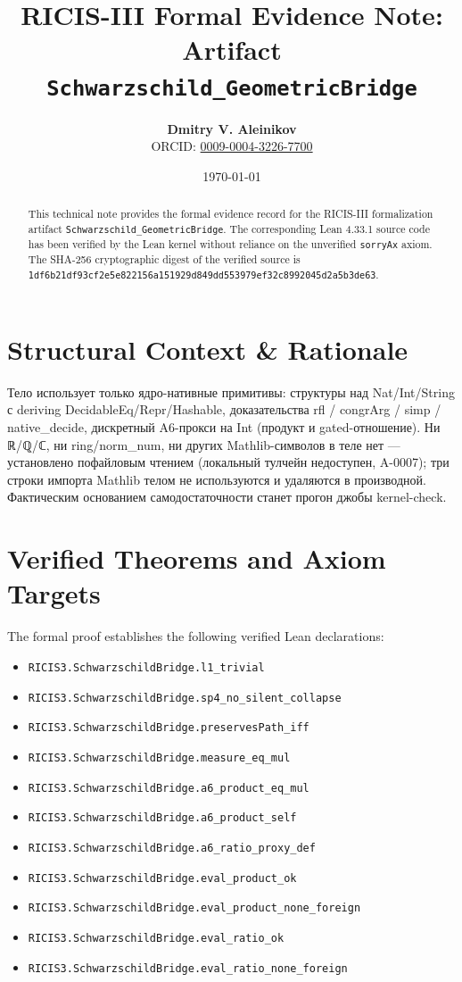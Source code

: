 \documentclass[11pt,a4paper]{article}
\title{\textbf{RICIS-III Formal Evidence Note:\\Artifact \texttt{Schwarzschild_GeometricBridge}}}
\author{\textbf{Dmitry V. Aleinikov}\\ORCID: \href{https://orcid.org/0009-0004-3226-7700}{0009-0004-3226-7700}}
\date{\today}
\begin{document}
\maketitle

\begin{abstract}
This technical note provides the formal evidence record for the RICIS-III formalization artifact \texttt{Schwarzschild_GeometricBridge}.
The corresponding Lean 4.33.1 source code has been verified by the Lean kernel without reliance on the unverified \texttt{sorryAx} axiom.
The SHA-256 cryptographic digest of the verified source is \texttt{1df6b21df93cf2e5e822156a151929d849dd553979ef32c8992045d2a5b3de63}.
\end{abstract}

\section{Structural Context & Rationale}
Тело использует только ядро-нативные примитивы: структуры над Nat/Int/String с deriving DecidableEq/Repr/Hashable, доказательства rfl / congrArg / simp / native_decide, дискретный A6-прокси на Int (продукт и gated-отношение). Ни ℝ/ℚ/ℂ, ни ring/norm_num, ни других Mathlib-символов в теле нет — установлено пофайловым чтением (локальный тулчейн недоступен, A-0007); три строки импорта Mathlib телом не используются и удаляются в производной. Фактическим основанием самодостаточности станет прогон джобы kernel-check.

\section{Verified Theorems and Axiom Targets}
The formal proof establishes the following verified Lean declarations:
\begin{itemize}
  \item \texttt{RICIS3.SchwarzschildBridge.l1_trivial}
  \item \texttt{RICIS3.SchwarzschildBridge.sp4_no_silent_collapse}
  \item \texttt{RICIS3.SchwarzschildBridge.preservesPath_iff}
  \item \texttt{RICIS3.SchwarzschildBridge.measure_eq_mul}
  \item \texttt{RICIS3.SchwarzschildBridge.a6_product_eq_mul}
  \item \texttt{RICIS3.SchwarzschildBridge.a6_product_self}
  \item \texttt{RICIS3.SchwarzschildBridge.a6_ratio_proxy_def}
  \item \texttt{RICIS3.SchwarzschildBridge.eval_product_ok}
  \item \texttt{RICIS3.SchwarzschildBridge.eval_product_none_foreign}
  \item \texttt{RICIS3.SchwarzschildBridge.eval_ratio_ok}
  \item \texttt{RICIS3.SchwarzschildBridge.eval_ratio_none_foreign}
\end{itemize}
\end{document}
